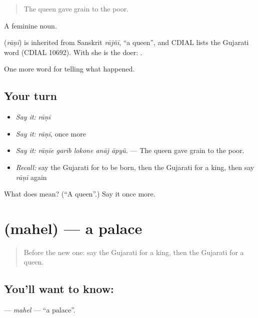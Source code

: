 \begin{quote}
The queen gave grain to the poor.
\end{quote}

A feminine noun.

\begin{cousinweb}
\textbf{} (\emph{rāṇī}) is inherited from Sanskrit \emph{rājñī}, \textquotedblleft{}a queen\textquotedblright{}, and CDIAL lists the Gujarati word (CDIAL 10692). With \textbf{} she is the doer: \textbf{  }.
\end{cousinweb}

\begin{grammarlens}[title={What you've built}]
One more word for telling what happened.
\end{grammarlens}

\subsection*{Your turn}
\begin{itemize}
\raggedright
  \item \emph{Say it:} \emph{rāṇī}
  \item \emph{Say it:} \emph{rāṇī}, once more
  \item \emph{Say it:} \emph{rāṇīe garīb lokone anāj āpyũ.} — The queen gave grain to the poor.
  \item \emph{Recall:} say the Gujarati for to be born, then the Gujarati for a king, then say \emph{rāṇī} again
\end{itemize}

\begin{tcolorbox}[breakable,colback=teal!4,colframe=teal!35!black,title={Before you move on}]
What does  mean? (\textquotedblleft{}A queen\textquotedblright{}.) Say it once more.
\end{tcolorbox}
\section[\texorpdfstring{\gu{મહેલ} (mahel)}{મહેલ (mahel)}]{ (mahel) — a palace}

\label{lesson:GU-C318-mahel}



\begin{quote}
Before the new one: say the Gujarati for a king, then the Gujarati for a queen.
\end{quote}

\subsection*{You'll want to know: }
\textbf{} — \emph{mahel} — \textquotedblleft{}a palace\textquotedblright{}.


